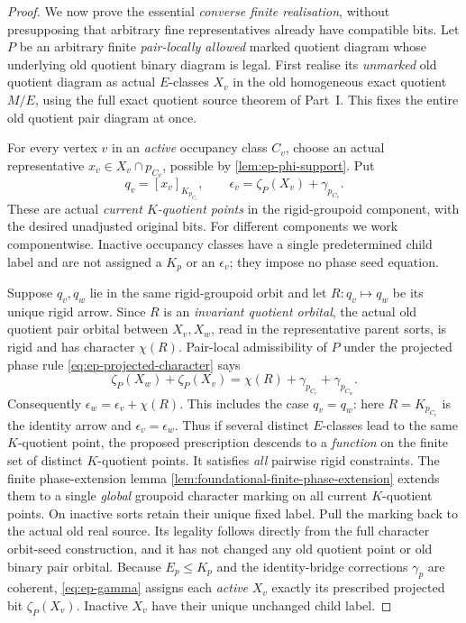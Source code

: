 \begin{proof}
We now prove the essential \emph{converse finite
realisation}, without presupposing that arbitrary
fine representatives already have compatible bits.
Let \(P\) be an arbitrary finite \emph{pair-locally
allowed} marked quotient diagram whose underlying
old quotient binary diagram is legal. First realise
its \emph{unmarked} old quotient diagram as actual
\(E\)-classes \(X_v\) in the old homogeneous exact
quotient \(M/E\), using the full exact quotient
source theorem of Part~I. This fixes the entire
old quotient pair diagram at once.

For every vertex \(v\) in an \emph{active} occupancy
class \(C_v\), choose an actual representative
\(x_v\in X_v\cap p_{C_v}\), possible
by \cref{lem:ep-phi-support}. Put
\[
 q_v=[x_v]_{K_{p_{C_v}}},\qquad
 \epsilon_v=\zeta_P(X_v)+\gamma_{p_{C_v}} .
\]
These are actual \emph{current \(K\)-quotient points}
in the rigid-groupoid component, with the desired
unadjusted original bits. For different components we
work componentwise. Inactive occupancy classes have a
single predetermined child label and are not assigned
a \(K_p\) or an \(\epsilon_v\); they impose no phase
seed equation.

Suppose \(q_v,q_w\) lie in the same rigid-groupoid
orbit and let \(R:q_v\mapsto q_w\) be its unique
rigid arrow. Since \(R\) is an \emph{invariant
quotient orbital}, the actual old quotient pair
orbital between \(X_v,X_w\), read in the
representative parent sorts, is rigid and has
character \(\chi(R)\). Pair-local admissibility
of \(P\) under the projected phase rule
\eqref{eq:ep-projected-character} says
\[
 \zeta_P(X_w)+\zeta_P(X_v)
 =\chi(R)+\gamma_{p_{C_v}}+\gamma_{p_{C_w}} .
\]
Consequently
\(\epsilon_w=\epsilon_v+\chi(R)\).
This includes the case \(q_v=q_w\): here
\(R=K_{p_{C_v}}\) is the identity arrow
and \(\epsilon_v=\epsilon_w\).
Thus if several distinct \(E\)-classes lead to
the same \(K\)-quotient point, the proposed
prescription descends to a \emph{function}
on the finite set of distinct \(K\)-quotient
points. It satisfies
\emph{all} pairwise rigid constraints. The
finite phase-extension lemma
\cref{lem:foundational-finite-phase-extension}
extends them to a single \emph{global} groupoid
character marking on all current \(K\)-quotient
points. On inactive sorts retain their unique fixed label.
Pull the marking back to the actual old real
source. Its legality follows directly from the
full character orbit-seed construction, and it
has not changed any old quotient point or old
binary pair orbital. Because \(E_p\le K_p\)
and the identity-bridge corrections \(\gamma_p\)
are coherent, \eqref{eq:ep-gamma} assigns
each \emph{active} \(X_v\) exactly its prescribed
projected bit \(\zeta_P(X_v)\). Inactive \(X_v\)
have their unique unchanged child label.


\end{proof}
